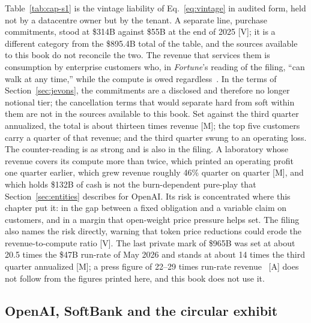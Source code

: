 Table~\ref{tab:cap-s1} is the vintage liability of Eq.~\eqref{eq:vintage} in audited form, held not by a datacentre owner but by the tenant. A separate line, purchase commitments, stood at \$314B against \$55B at the end of 2025 [V]; it is a different category from the \$895.4B total of the table, and the sources available to this book do not reconcile the two. The revenue that services them is consumption by enterprise customers who, in \emph{Fortune}'s reading of the filing, ``can walk at any time,'' while the compute is owed regardless~\cite{cap-anthropic-s1}. In the terms of Section~\ref{sec:jevons}, the commitments are a disclosed and therefore no longer notional tier; the cancellation terms that would separate hard from soft within them are not in the sources available to this book. Set against the third quarter annualized, the total is about thirteen times revenue [M]; the top five customers carry a quarter of that revenue; and the third quarter swung to an operating loss. The counter-reading is as strong and is also in the filing. A laboratory whose revenue covers its compute more than twice, which printed an operating profit one quarter earlier, which grew revenue roughly 46\% quarter on quarter [M], and which holds \$132B of cash is not the burn-dependent pure-play that Section~\ref{sec:entities} describes for OpenAI. Its risk is concentrated where this chapter put it: in the gap between a fixed obligation and a variable claim on customers, and in a margin that open-weight price pressure helps set. The filing also names the risk directly, warning that token price reductions could erode the revenue-to-compute ratio [V]. The last private mark of \$965B was set at about 20.5 times the \$47B run-rate of May 2026 and stands at about 14 times the third quarter annualized [M]; a press figure of 22--29 times run-rate revenue~\cite{cap-anthropic-s1} [A] does not follow from the figures printed here, and this book does not use it.

\subsection{OpenAI, SoftBank and the circular exhibit}
\label{sec:cap-openai}

